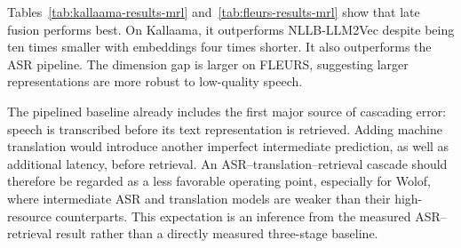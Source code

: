 \begin{table}[ht]
    \centering
    \caption{Document-retrieval nDCG on Fleurs-Retrieval-Eval.}
    \label{tab:fleurs-results-mrl}
\end{table}

Tables~\ref{tab:kallaama-results-mrl} and~\ref{tab:fleurs-results-mrl} show that late fusion performs best. On Kallaama, it outperforms NLLB-LLM2Vec despite being ten times smaller with embeddings four times shorter. It also outperforms the ASR pipeline. The dimension gap is larger on FLEURS, suggesting larger representations are more robust to low-quality speech.

The pipelined baseline already includes the first major source of cascading error: speech is transcribed before its text representation is retrieved. Adding machine translation would introduce another imperfect intermediate prediction, as well as additional latency, before retrieval. An ASR--translation--retrieval cascade should therefore be regarded as a less favorable operating point, especially for Wolof, where intermediate ASR and translation models are weaker than their high-resource counterparts. This expectation is an inference from the measured ASR--retrieval result rather than a directly measured three-stage baseline.

